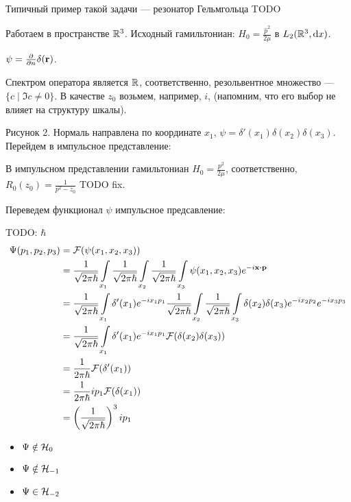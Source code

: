 Типичный пример такой задачи — резонатор Гельмгольца TODO

Работаем в пространстве $\mathbb{R}^3$. Исходный гамильтониан: $H_0 = \frac{\hat{p}^2}{2 \mu}$ в $L_2(\mathbb{R}^3, \dd x)$.


$\psi = \pdv{n} \delta(\vb{r})$.

Спектром оператора является $\mathbb{R}$, соответственно, резольвентное множество — $\{ c \mid \Im c \ne 0 \}$. В качестве $z_0$ возьмем, например, $i$, (напомним, что его выбор не влияет на структуру шкалы).


Рисунок 2. Нормаль направлена по координате $x_1$, $\psi = \delta'(x_1) \delta(x_2) \delta(x_3)$. Перейдем в импульсное представление:

В импульсном представлении гамильтониан $H_0 = \frac{p^2}{2 \mu}$, соответственно, $R_0(z_0) = \frac{1}{p^2 - z_0}$ TODO fix.

Переведем функционал $\psi$ импульсное предсавление:

TODO: $\hbar$
\begin{align*}
\Psi(p_1, p_2, p_3)
&= \mathcal{F}(\psi(x_1, x_2, x_3)) \\
&= \frac{1}{\sqrt{2 \pi \hbar}} \int\limits_{x_1} \frac{1}{\sqrt{2 \pi \hbar}} \int\limits_{x_2} \frac{1}{\sqrt{2 \pi \hbar}} \int\limits_{x_3} \psi(x_1, x_2, x_3) e^{-i \vb{x} \vdot \vb{p}} \\
&= \frac{1}{\sqrt{2 \pi \hbar}} \int\limits_{x_1} \delta'(x_1) e^{-i x_1 p_1} \frac{1}{\sqrt{2 \pi \hbar}} \int\limits_{x_2} \frac{1}{\sqrt{2 \pi \hbar}} \int\limits_{x_3} \delta(x_2) \delta(x_3) e^{-i x_2 p_2} e^{-i x_3 p_3} \\
&= \frac{1}{\sqrt{2 \pi \hbar}} \int\limits_{x_1} \delta'(x_1) e^{-i x_1 p_1} \mathcal{F}(\delta(x_2) \delta(x_3)) \\
&= \frac{1}{2 \pi \hbar} \mathcal{F}(\delta'(x_1)) \\
&= \frac{1}{2 \pi \hbar} i p_1 \mathcal{F}(\delta(x_1)) \\
&= \left(\frac{1}{\sqrt{2 \pi \hbar}}\right)^3 i p_1
\end{align*}

\begin{itemize}
\item $\Psi \notin \mathcal{H}_{0}$ 
\item $\Psi \notin \mathcal{H}_{-1}$
\item $\Psi \in \mathcal{H}_{-2}$
\end{itemize}


